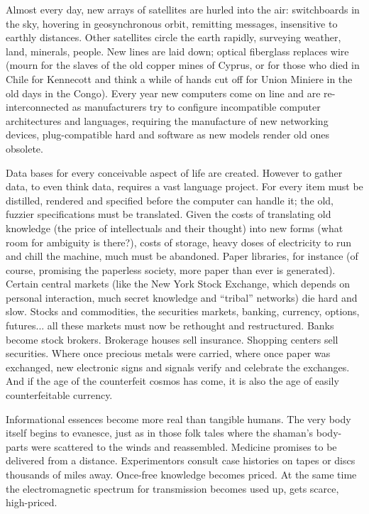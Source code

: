 \documentclass[11pt,twoside,draft]{memoir}
\begin{document}
Almost every day, new arrays of satellites are hurled into the air: switchboards in the sky, hovering in geosynchronous orbit, remitting messages, insensitive to earthly distances. Other satellites circle the earth rapidly, surveying weather, land, minerals, people. New lines are laid down; optical fiberglass replaces wire (mourn for the slaves of the old copper mines of Cyprus, or for those who died in Chile for Kennecott and think a while of hands cut off for Union Miniere in the old days in the Congo). Every year new computers come on line and are re-interconnected as manufacturers try to configure incompatible computer architectures and languages, requiring the manufacture of new networking devices, plug-compatible hard and software as new models render old ones obsolete.

Data bases for every conceivable aspect of
life are created. However to gather data, to
even think data, requires a vast language
project. For every item must be distilled,
rendered and specified before the computer
can handle it; the old, fuzzier specifications
must be translated. Given the costs of translating 
old knowledge (the price of intellectuals 
and their thought) into new forms (what
room for ambiguity is there?), costs of storage,
heavy doses of electricity to run and
chill the machine, much must be abandoned.
Paper libraries, for instance (of course, promising
the paperless society, more paper than
ever is generated). Certain central markets
(like the New York Stock Exchange, which
depends on personal interaction, 
much secret knowledge and \enquote{tribal} networks) die
hard and slow. Stocks and commodities, the
securities markets, banking, currency, options, 
futures... all these markets must now
be rethought and restructured. Banks become
stock brokers. Brokerage houses sell
insurance. Shopping centers sell securities.
Where once precious metals were carried,
where once paper was exchanged, new electronic
signs and signals verify and celebrate
the exchanges. And if the age of the counterfeit
cosmos has come, it is also the age of
easily counterfeitable currency.

Informational essences become more real
than tangible humans. The very body itself
begins to evanesce, just as in those folk tales
where the shaman's body-parts were scattered 
to the winds and reassembled. Medicine
promises to be delivered from a distance.
Experimentors consult case histories
on tapes or discs thousands of miles away.
Once-free knowledge becomes priced. At
the same time the electromagnetic spectrum
for transmission becomes used up, gets
scarce, high-priced.
\end{document}
